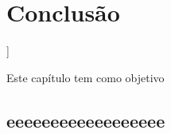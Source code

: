 \chapter{Conclusão}]

\label{CAP9}


Este capítulo tem como objetivo 


\section{eeeeeeeeeeeeeeeeee}\label{Sub:equa}
